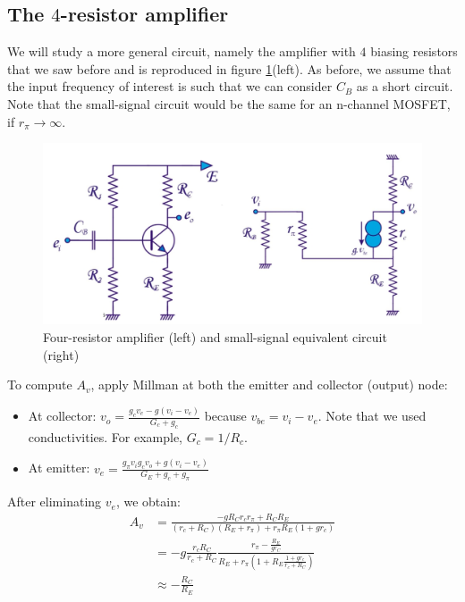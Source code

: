 \subsection{The $4$-resistor amplifier}
\label{sec:four_resistor}
We will study a more general circuit, namely the amplifier with $4$ biasing resistors that we saw before and is reproduced in figure \ref{fig:amplifier4}(left). As before, we assume that the input frequency of interest is such that we can consider $C_B$ as a short circuit. Note that the small-signal circuit would be the same for an n-channel MOSFET, if $r_{\pi} \rightarrow \infty$.\\
\begin{figure}[h!]
	\centering
	\includegraphics[width=14cm]{figures/ch02/amplifier4.jpg}
	\caption{Four-resistor amplifier (left) and small-signal equivalent circuit (right)}
	\label{fig:amplifier4}
\end{figure}
To compute $A_v$, apply Millman at both the emitter and collector (output) node:
\begin{itemize}
	\item At collector: $v_o = \frac{g_c v_e - g(v_i - v_e)}{G_c + g_c}$ because  $v_{be} = v_i - v_e$. Note that we used conductivities. For example, $G_c = 1/R_c$.
	\item At emitter: $v_e = \frac{g_{\pi} v_i g_c v_o + g(v_i - v_e)}{G_E + g_c + g_{\pi}}$
\end{itemize}
After eliminating $v_e$, we obtain:
\begin{equation}
	\begin{split}
		A_v &= \frac{-g R_C r_c r_{\pi} + R_C R_E}{(r_c + R_C)(R_E + r_{\pi}) + r_{\pi} R_E(1 + g r_c)}\\
		&= -g \frac{r_c R_C}{r_c + R_C} \frac{r_{\pi} - \frac{R_E}{g r_C}}{R_E + r_{\pi}(1 + R_E \frac{1+ g r_c}{r_c + R_C})} \\
		&\approx -\frac{R_C}{R_E}
	\end{split}
	\label{eq:4resistor_dc}
\end{equation}
